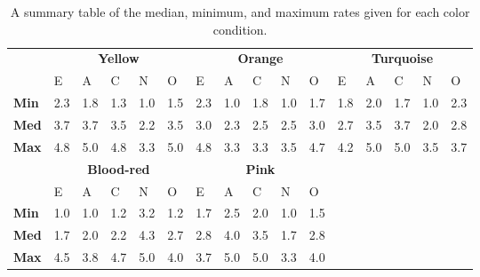 \begin{table}[hbt!]
    \renewcommand{\arraystretch}{1}
    \begin{center}
        \begin{tabular}{p{}|
        p{}|p{}|p{}|p{}|p{}||
        p{}|p{}|p{}|p{}|p{}||
        p{}|p{}|p{}|p{}|p{}|}
            \cline{2-16}
            & \multicolumn{5}{c||}{\textbf{Yellow}} & \multicolumn{5}{c||}{\textbf{Orange}}
            & \multicolumn{5}{c|}{\textbf{Turquoise}} \\
            \cline{2-16}
            & E & A & C & N & O & E & A & C & N & O & E & A & C & N & O      \\
            \cline{2-16}
            \textbf{Min}    & 2.3 & 1.8 & 1.3 & 1.0 & 1.5 & 2.3 & 1.0 & 1.8 & 1.0 & 1.7 & 1.8 & 2.0 & 1.7 & 1.0 & 2.3  \\
            \textbf{Med}    & 3.7 & 3.7 & 3.5 & 2.2 & 3.5 & 3.0 & 2.3 & 2.5 & 2.5 & 3.0 & 2.7 & 3.5 & 3.7 & 2.0 & 2.8  \\
            \textbf{Max}    & 4.8 & 5.0 & 4.8 & 3.3 & 5.0 & 4.8 & 3.3 & 3.3 & 3.5 & 4.7 & 4.2 & 5.0 & 5.0 & 3.5 & 3.7 \\
            \cline{2-16}
            \cline{2-11}
            &  \multicolumn{5}{|c||}{\textbf{Blood-red}} & \multicolumn{5}{|c||}{\textbf{Pink}} \\
            \cline{2-11}
            & E & A & C & N & O & E & A & C & N & O            \\
            \cline{2-11}
            \textbf{Min}    & 1.0 & 1.0 & 1.2 & 3.2 & 1.2 & 1.7 & 2.5 & 2.0 & 1.0 & 1.5    \\
            \textbf{Med}    & 1.7 & 2.0 & 2.2 & 4.3 & 2.7 & 2.8 & 4.0 & 3.5 & 1.7 & 2.8    \\
            \textbf{Max}    & 4.5 & 3.8 & 4.7 & 5.0 & 4.0 & 3.7 & 5.0 & 5.0 & 3.3 & 4.0    \\
            \cline{2-11}
        \end{tabular}
        \caption[]{A summary table of the median, minimum, and maximum rates given for each color condition.\footnotemark}
        \label{table:medianML2}
    \end{center}
\end{table}


